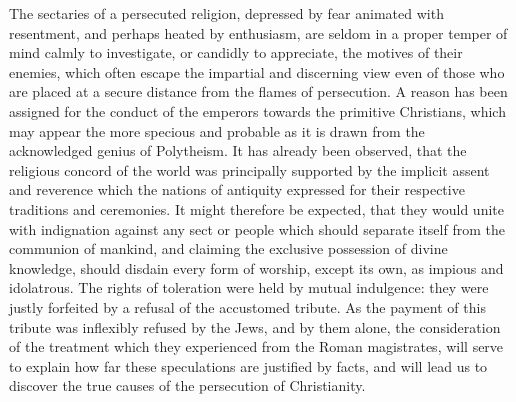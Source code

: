 
The sectaries of a persecuted religion, depressed by fear
animated with resentment, and perhaps heated by enthusiasm, are
seldom in a proper temper of mind calmly to investigate, or
candidly to appreciate, the motives of their enemies, which often
escape the impartial and discerning view even of those who are
placed at a secure distance from the flames of persecution. A
reason has been assigned for the conduct of the emperors towards
the primitive Christians, which may appear the more specious and
probable as it is drawn from the acknowledged genius of
Polytheism. It has already been observed, that the religious
concord of the world was principally supported by the implicit
assent and reverence which the nations of antiquity expressed for
their respective traditions and ceremonies. It might therefore be
expected, that they would unite with indignation against any sect
or people which should separate itself from the communion of
mankind, and claiming the exclusive possession of divine
knowledge, should disdain every form of worship, except its own,
as impious and idolatrous. The rights of toleration were held by
mutual indulgence: they were justly forfeited by a refusal of the
accustomed tribute. As the payment of this tribute was inflexibly
refused by the Jews, and by them alone, the consideration of the
treatment which they experienced from the Roman magistrates, will
serve to explain how far these speculations are justified by
facts, and will lead us to discover the true causes of the
persecution of Christianity.

